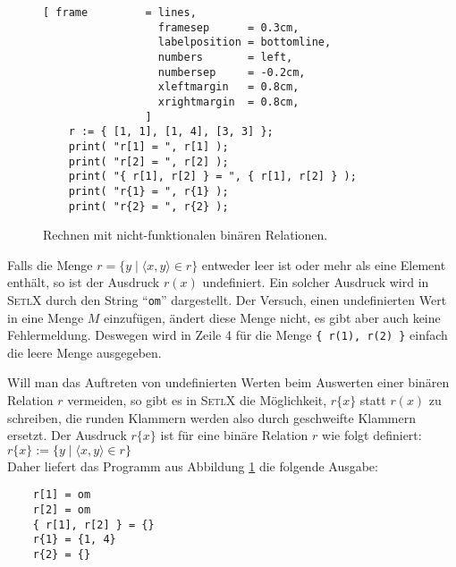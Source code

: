 \begin{figure}[!ht]
  \centering
\begin{Verbatim}[ frame         = lines, 
                  framesep      = 0.3cm, 
                  labelposition = bottomline,
                  numbers       = left,
                  numbersep     = -0.2cm,
                  xleftmargin   = 0.8cm,
                  xrightmargin  = 0.8cm,
                ]
    r := { [1, 1], [1, 4], [3, 3] };
    print( "r[1] = ", r[1] );
    print( "r[2] = ", r[2] );
    print( "{ r[1], r[2] } = ", { r[1], r[2] } );
    print( "r{1} = ", r{1} );
    print( "r{2} = ", r{2} );
\end{Verbatim} 
\vspace*{-0.3cm}
\caption{Rechnen mit nicht-funktionalen bin\"{a}ren Relationen.}  \label{fig:buggy-function.stlx}
\end{figure} %

Falls die Menge  $r = \{ y \mid \langle x, y \rangle \in r \}$  entweder leer ist
oder mehr als eine Element enth\"{a}lt, so ist der Ausdruck $r(x)$ undefiniert.
Ein solcher Ausdruck wird in \textsc{SetlX} durch den String ``\texttt{om}'' dargestellt.
Der Versuch, einen undefinierten Wert in eine Menge $M$ einzuf\"{u}gen, \"{a}ndert diese
Menge nicht, es gibt aber auch keine Fehlermeldung.  Deswegen wird in Zeile 4 f\"{u}r 
die Menge \texttt{\{ r(1), r(2) \}} einfach die leere Menge ausgegeben.

Will man das Auftreten von undefinierten Werten beim Auswerten einer bin\"{a}ren
Relation $r$ vermeiden, so gibt es in \textsc{SetlX} die M\"{o}glichkeit, $r\{x\}$ statt
$r(x)$ zu schreiben, die runden Klammern werden also durch geschweifte Klammern ersetzt.  
Der Ausdruck $r\{x\}$  ist f\"{u}r eine bin\"{a}re Relation $r$ wie folgt definiert: 
\\[0.2cm]
\hspace*{1.3cm}
 $r\{x\} := \{ y \mid \langle x, y \rangle \in r \}$ 
\\[0.2cm]
Daher liefert das Programm aus Abbildung \ref{fig:buggy-function.stlx} die folgende Ausgabe:
\begin{verbatim}
    r[1] = om
    r[2] = om
    { r[1], r[2] } = {}
    r{1} = {1, 4}
    r{2} = {}

\end{verbatim}

